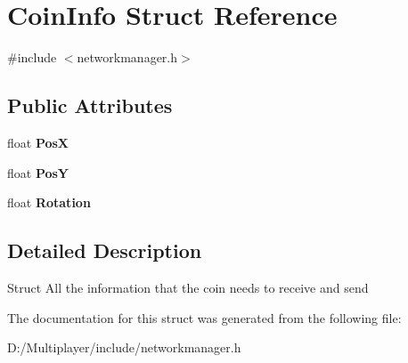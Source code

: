 \hypertarget{struct_coin_info}{}\section{Coin\+Info Struct Reference}
\label{struct_coin_info}


{\ttfamily \#include $<$networkmanager.\+h$>$}

\subsection*{Public Attributes}
\begin{DoxyCompactItemize}
\item 
\mbox{\label{struct_coin_info_abd8a234b9f1b4357dfbb2fdfc9b101c0}} 
float {\bfseries PosX}
\item 
\mbox{\label{struct_coin_info_ae14323c2d25b8560db89f05475618697}} 
float {\bfseries PosY}
\item 
\mbox{\label{struct_coin_info_a52aa89d376182bb0d2f44d2eac17b86f}} 
float {\bfseries Rotation}
\end{DoxyCompactItemize}


\subsection{Detailed Description}
Struct All the information that the coin needs to receive and send 

The documentation for this struct was generated from the following file\+:\begin{DoxyCompactItemize}
\item 
D\+:/\+Multiplayer/include/networkmanager.\+h\end{DoxyCompactItemize}
